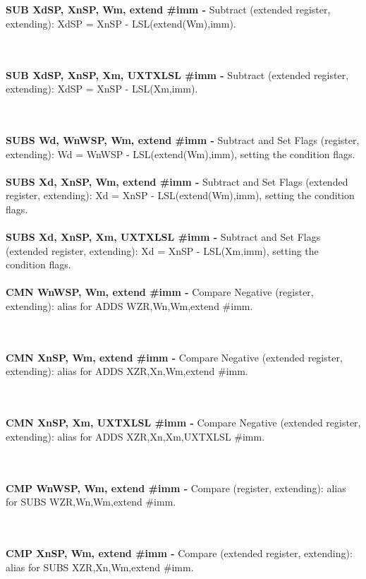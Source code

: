 \documentclass[12pt,a4paper,utf8]{ppgsi}
\begin{document}
\\\\\textbf{SUB Xd\textbar SP, Xn\textbar SP, Wm, extend {#imm} -} Subtract (extended register, extending): Xd\textbar SP = Xn\textbar SP - LSL(extend(Wm),imm). 

\\\\\textbf{SUB Xd\textbar SP, Xn\textbar SP, Xm{, UXTX\textbar LSL \#imm} -} Subtract (extended register, extending): Xd\textbar SP = Xn\textbar SP - LSL(Xm,imm). 

\\\\\textbf{SUBS Wd, Wn\textbar WSP, Wm, extend {#imm} -} Subtract and Set Flags (register, extending): Wd = Wn\textbar WSP - LSL(extend(Wm),imm), setting the
condition flags. 
\\\\\textbf{SUBS Xd, Xn\textbar SP, Wm, extend {#imm} -} Subtract and Set Flags (extended register, extending): Xd = Xn\textbar SP - LSL(extend(Wm),imm),
setting the condition flags. 
\\\\\textbf{SUBS Xd, Xn\textbar SP, Xm{, UXTX\textbar LSL \#imm} -} Subtract and Set Flags (extended register, extending): Xd = Xn\textbar SP - LSL(Xm,imm), setting the
condition flags. 
\\\\\textbf{CMN Wn\textbar WSP, Wm, extend {#imm} -} Compare Negative (register, extending): alias for ADDS WZR,Wn,Wm,extend {#imm}. 

\\\\\textbf{CMN Xn\textbar SP, Wm, extend {#imm} -} Compare Negative (extended register, extending): alias for ADDS XZR,Xn,Wm,extend {#imm}. 

\\\\\textbf{CMN Xn\textbar SP, Xm{, UXTX\textbar LSL \#imm} -} Compare Negative (extended register, extending): alias for ADDS XZR,Xn,Xm{,UXTX\textbar LSL \#imm}. 

\\\\\textbf{CMP Wn\textbar WSP, Wm, extend {#imm} -} Compare (register, extending): alias for SUBS WZR,Wn,Wm,extend {#imm}. 

\\\\\textbf{CMP Xn\textbar SP, Wm, extend {#imm} -} Compare (extended register, extending): alias for SUBS XZR,Xn,Wm,extend {#imm}. 
\end{document}
